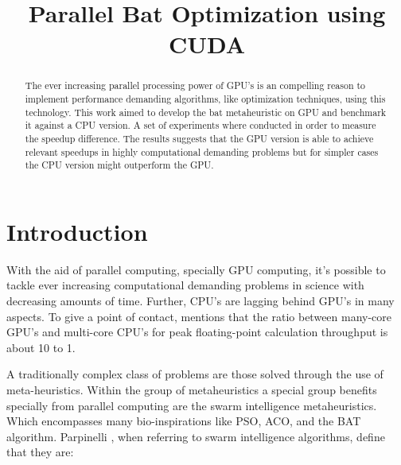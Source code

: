 \documentclass[conference]{IEEEtran}
\begin{document}
\title{Parallel Bat Optimization using CUDA}

\author{
\and
{}
}

\maketitle

\begin{abstract}
The ever increasing parallel processing power of GPU's is an compelling
reason to implement performance demanding algorithms, like optimization
techniques, using this technology. This work aimed to develop the bat
metaheuristic on GPU and benchmark it against a CPU version. A set of
experiments where conducted in order to measure the speedup difference.
The results suggests that the GPU version is able to achieve relevant
speedups in highly computational demanding problems but for simpler
cases the CPU version might outperform the GPU.
\end{abstract}

\IEEEpeerreviewmaketitle

\section{Introduction} %

With the aid of parallel computing, specially GPU computing, it's
possible to tackle ever increasing computational demanding problems in science
with decreasing amounts of time. Further, CPU's are lagging behind GPU's in
many aspects. To give a point of contact, \cite{programmingProcessors}
mentions that the ratio between many-core GPU's and multi-core CPU's for
peak floating-point calculation throughput is about 10 to 1.

A traditionally complex class of problems are those solved through
the use of meta-heuristics. Within the group of metaheuristics a
special group benefits specially from parallel computing are the swarm
intelligence metaheuristics. Which encompasses many bio-inspirations
like PSO, ACO, and the BAT algorithm. Parpinelli
\cite{newInspirations}, when referring to swarm intelligence algorithms,
define that they are:
\end{document}
